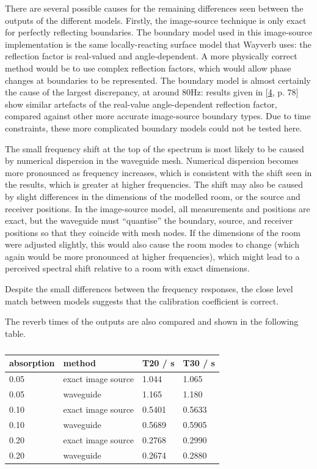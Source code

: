 \documentclass[]{scrreprt}
\begin{document}
There are several possible causes for the remaining differences seen
between the outputs of the different models. Firstly, the image-source
technique is only exact for perfectly reflecting boundaries. The
boundary model used in this image-source implementation is the same
locally-reacting surface model that Wayverb uses: the reflection factor
is real-valued and angle-dependent. A more physically correct method
would be to use complex reflection factors, which would allow phase
changes at boundaries to be represented. The boundary model is almost
certainly the cause of the largest discrepancy, at around 80Hz: results
given in {[}\protect\hyperlink{ref-aretzux5fcombinedux5f2009}{4}, p.
78{]} show similar artefacts of the real-value angle-dependent
reflection factor, compared against other more accurate image-source
boundary types. Due to time constraints, these more complicated boundary
models could not be tested here.

The small frequency shift at the top of the spectrum is most likely to
be caused by numerical dispersion in the waveguide mesh. Numerical
dispersion becomes more pronounced as frequency increases, which is
consistent with the shift seen in the results, which is greater at
higher frequencies. The shift may also be caused by slight differences
in the dimensions of the modelled room, or the source and receiver
positions. In the image-source model, all measurements and positions are
exact, but the waveguide must ``quantise'' the boundary, source, and
receiver positions so that they coincide with mesh nodes. If the
dimensions of the room were adjusted slightly, this would also cause the
room modes to change (which again would be more pronounced at higher
frequencies), which might lead to a perceived spectral shift relative to
a room with exact dimensions.

Despite the small differences between the frequency responses, the close
level match between models suggests that the calibration coefficient is
correct.

The reverb times of the outputs are also compared and shown in the
following table.

\begin{table}[ht]
\centering

\caption{}

\begin{tabular}{@{}llll@{}}
\toprule

absorption & method & T20 / s & T30 / s \\\midrule

0.05 & exact image source & 1.044 & 1.065 \\
0.05 & waveguide & 1.165 & 1.180 \\
0.10 & exact image source & 0.5401 & 0.5633 \\
0.10 & waveguide & 0.5689 & 0.5905 \\
0.20 & exact image source & 0.2768 & 0.2990 \\
0.20 & waveguide & 0.2674 & 0.2880 \\

\bottomrule
\end{tabular}

\end{table}
\end{document}
